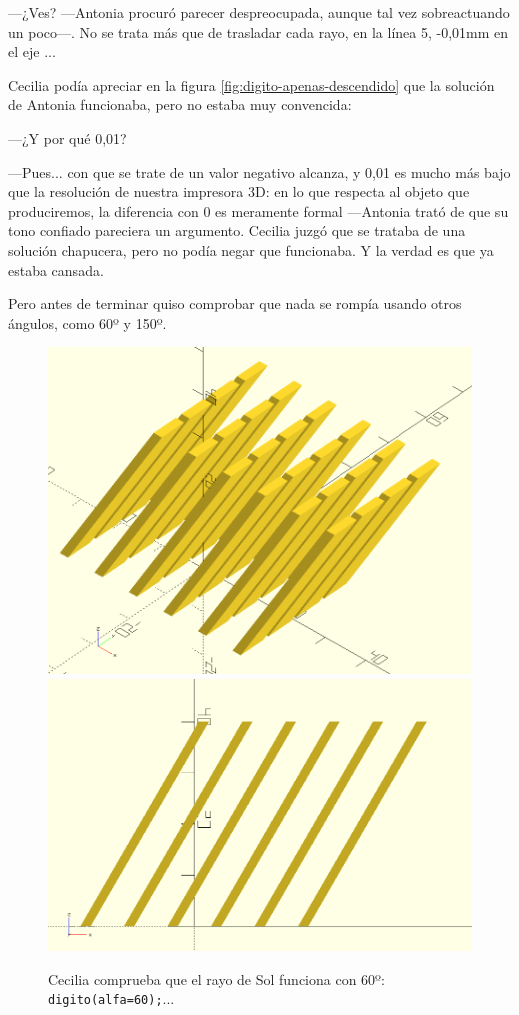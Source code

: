     ---¿Ves? ---Antonia procuró parecer despreocupada, aunque tal vez
    sobreactuando un poco---. No se trata más que de trasladar cada
    rayo, en la línea 5, -0,01mm en el eje ...

    Cecilia podía apreciar en la figura
    \ref{fig:digito-apenas-descendido} que la solución de Antonia
    funcionaba, pero no estaba muy convencida:
    
    ---¿Y por qué 0,01?

    ---Pues... con que se trate de un valor negativo alcanza, y 0,01
    es mucho más bajo que la resolución de nuestra impresora 3D: en lo
    que respecta al objeto que produciremos, la diferencia con 0 es
    meramente formal ---Antonia trató de que su tono confiado
    pareciera un argumento. Cecilia juzgó que se trataba de una
    solución chapucera, pero no podía negar que funcionaba. Y la
    verdad es que ya estaba cansada.
    
    Pero antes de terminar quiso comprobar que nada se rompía usando
    otros ángulos, como 60º y 150º.



  \begin{figure}[ht]
    \centering
  \includegraphics[width=.49\textwidth]{imagenes/matriz-60}\hfill
  \includegraphics[width=.49\textwidth]{imagenes/matriz-60-perfil}
  \caption{Cecilia comprueba que el rayo de Sol funciona con 60º:
    \lstinline!digito(alfa=60);!...}
    \label{fig:matriz-60}
  \end{figure}
  

